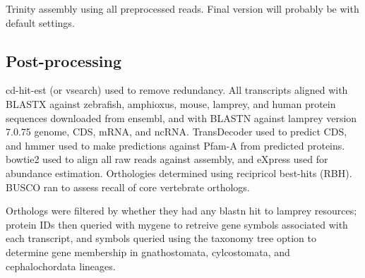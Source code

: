 \documentclass{article}
\begin{document}
Trinity assembly using all preprocessed reads. Final version will probably be with default settings.

\subsection*{Post-processing}

cd-hit-est (or vsearch) used to remove redundancy.
All transcripts aligned with BLASTX against zebrafish, amphioxus, mouse, lamprey, and human protein sequences
downloaded from ensembl, and with BLASTN against lamprey version 7.0.75 genome, CDS, mRNA, and
ncRNA. TransDecoder used to predict CDS, and hmmer used to make predictions against Pfam-A from
predicted proteins. bowtie2 used to align all raw reads against assembly, and eXpress used for
abundance estimation. Orthologies determined using recipricol best-hits (RBH). BUSCO ran to assess
recall of core vertebrate orthologs.

Orthologs were filtered by whether they had any blastn hit to lamprey resources; protein IDs then
queried with mygene to retreive gene symbols associated with each transcript, and symbols queried
using the taxonomy tree option to determine gene membership in gnathostomata, cylcostomata, and
cephalochordata lineages.



\end{document}
